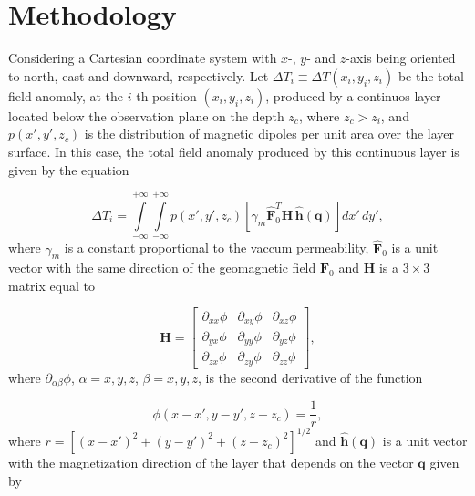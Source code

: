 \section{Methodology}
\label{sec:methodology}


Considering a Cartesian coordinate system with $x$-, $y$- and $z$-axis being oriented to north, east and downward, respectively. Let $\Delta T_i \equiv \Delta T (x_i,y_i,z_i)$ be the total field anomaly, at the $i$-th position $(x_i,y_i,z_i)$, produced by a continuos layer located below the observation plane on the depth $z_c$, where $z_c > z_i$, and $p(x',y',z_c)$ is the distribution of magnetic dipoles per unit area over the layer surface. In this case, the total field anomaly produced by this continuous layer is given by the equation 

\begin{equation}
\Delta T_i = \int \limits_{-\infty}^{+\infty } \int \limits_{-\infty}^{+\infty }  p(x',y',z_c)  [\gamma_m \hat{\mathbf{F}}_0^T \mathbf{H} \,\hat{\mathbf{h}}(\mathbf{q})] dx' \,dy',
\label{eq:continuous_layer}
\end{equation}
where $\gamma_m$ is a constant proportional to the vaccum permeability, $\hat{\mathbf{F}}_0$ is a unit vector with the same direction of the geomagnetic field $\mathbf{F}_0$ and $\mathbf{H}$ is a $3 \times 3$ matrix equal to  

 \begin{equation}
   \mathbf{H} =
   \left[ \begin{array}{ccc}
   \partial_{xx} \phi & \partial_{xy} \phi &\partial_{xz} \phi \\  \partial_{yx} \phi & \partial_{yy} \phi &\partial_{yz} \phi \\  \partial_{zx} \phi &\partial_{zy}\phi  & \partial_{zz} \phi    
   \end{array} \right] ,
   \label{eq:H}
 \end{equation}
where $\partial_{\alpha \beta}\phi$, $\alpha = x, y, z$, $\beta = x, y, z$, is the second derivative of the function 

\begin{equation}
   \phi (x-x', y-y', z-z_c) = \frac{1}{r} ,
   \label{eq:phi}
 \end{equation}
where $r = [(x-x')^2 + (y-y')^2 + (z-z_c)^2]^{1/2}$ and $\hat{\mathbf{h}}(\mathbf{q})$ is a unit vector with the
magnetization direction of the layer that depends on the vector $\mathbf{q}$ given by 

